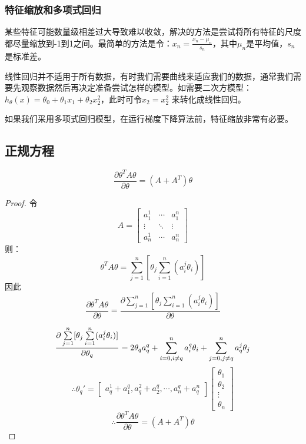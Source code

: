 \documentclass[cn,hazy,blue,normal,14pt]{elegantnote}
\begin{document}
\subsubsection{特征缩放和多项式回归}
某些特征可能数量级相差过大导致难以收敛，解决的方法是尝试将所有特征的尺度都尽量缩放到-1到1之间。最简单的方法是令：$x_n=\frac{x_n-\mu_n}{s_n}$，其中$\mu_n$是平均值，$s_n$是标准差。

线性回归并不适用于所有数据，有时我们需要曲线来适应我们的数据，通常我们需要先观察数据然后再决定准备尝试怎样的模型。如需要二次方模型：$h_\theta(x)=\theta_0+\theta_1x_1+\theta_2 x_2^2$，此时可令$x_2=x_2^2$ 来转化成线性回归。

\begin{note}
  如果我们采用多项式回归模型，在运行梯度下降算法前，特征缩放非常有必要。
\end{note}
\subsection{正规方程}
\begin{lemma}
$$
\frac{\partial \theta^TA\theta}{\partial \theta}=(A+A^T)\theta
$$
\end{lemma}
\begin{proof}
令
$$
A=
\begin{bmatrix}
    a_1^1 &\cdots & a_1^n \\
    \vdots &\ddots & \vdots \\
    a_n^1 & \cdots & a_n^n
\end{bmatrix}
$$
则：
$$
\theta^TA\theta=\sum_{j=1}^{n}[\theta_j \sum_{i=1}^{n}(a_i^j\theta_i)]
$$
因此
$$
\frac{\partial \theta^TA\theta}{\partial \theta}=\frac{\partial \sum\limits_{j=1}^{n}[\theta_j \sum\limits_{i=1}^{n}(a_i^j\theta_i)]}{\partial 	\theta}
$$

$$
\frac{\partial \sum\limits_{j=1}^{n}[\theta_j \sum_{i=1}^{n}\limits(a_i^j\theta_i)]}{\partial \theta_q}=2\theta_qa_q^q+\sum_{i=0,i \neq q}^{n}a_i^q\theta_i+\sum_{j=0,j\neq q}^{n}a_q^j\theta_j
$$
$$
\therefore \theta_q'=\begin{bmatrix}
    a_q^1+a_1^q,a_q^2+a_2^q,\cdots,a_n^q+a_q^n
\end{bmatrix}
\begin{bmatrix}
    \theta_1 \\
    \theta_2 \\
    \vdots \\
    \theta_n
\end{bmatrix}
$$
$$
\therefore \frac{\partial \theta^TA\theta}{\partial \theta}=(A+A^T)\theta
$$
\end{proof}
\end{document}
